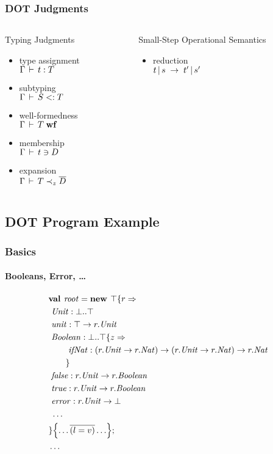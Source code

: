 \documentclass{beamer}
\begin{document}
\begin{frame}
\frametitle{DOT Judgments}
\begin{columns}
\begin{column}[t]{5cm}
\begin{block}{Typing Judgments}
\begin{itemize}
\item type assignment\\$\Gamma \,\vdash\, t : T$
\item subtyping\\$\Gamma \,\vdash\, S <: T$
\item well-formedness\\$\Gamma \,\vdash\, T \;\mbox{\textbf{wf}}$
\item membership\\$\Gamma \,\vdash\, t \ni D$
\item expansion\\$\Gamma \,\vdash\, T \prec_z \overline{D}$
\end{itemize}
\end{block}
\end{column}
\begin{column}[t]{5cm}
\begin{block}{Small-Step Operational Semantics}
\begin{itemize}
\item reduction\\$t \operatorname{|} s \;\rightarrow\; t' \operatorname{|} s'$
\end{itemize}
\end{block}
\end{column}
\end{columns}
\end{frame}

\subsection{DOT Program Example}

\begin{frame}
\frametitle{Basics}
\framesubtitle{Booleans, Error, \ldots}
\begin{align*}
&\textbf{val }\mathit{root} = \textbf{new }\top \{r \Rightarrow \\
&\ \mathit{Unit} : \bot..\top\\
&\ \mathit{unit} : \top \rightarrow {r.\mathit{Unit}}\\
&\ \mathit{Boolean} : \bot..\top \{z \Rightarrow \\
&\ \quad\quad \mathit{ifNat} : (r.\mathit{Unit} \rightarrow r.\mathit{Nat}) \rightarrow (r.\mathit{Unit} \rightarrow r.\mathit{Nat}) \rightarrow r.\mathit{Nat}\\
&\quad\quad \}\\
&\ \mathit{false} : {r.\mathit{Unit}} \rightarrow {r.\mathit{Boolean}}\\
&\ \mathit{true} : {r.\mathit{Unit}} \rightarrow {r.\mathit{Boolean}}\\
&\ \mathit{error} : {r.\mathit{Unit}} \rightarrow \bot\\
&\ \ldots\\
& \}{\left\{\ldots \overline{(l = v)} \ldots \right\}} ;\;\\& \ldots
\end{align*}
\end{frame}
\end{document}
